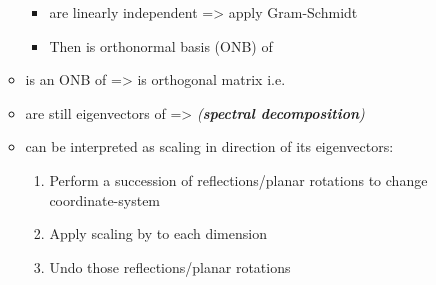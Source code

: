 \begin{itemize}
\begin{itemize}
    \begin{itemize}
    
    \item
       are linearly
      independent =\textgreater{} apply Gram-Schmidt
    \item
      Then  is
      orthonormal basis (ONB) of 
    \end{itemize}
  \item
     is
    an ONB of  =\textgreater{}
     is
    orthogonal matrix i.e.~
  \item
     are still eigenvectors
    of  =\textgreater{} 
    \emph{(\textbf{spectral decomposition})}
  \item
     can be interpreted as scaling
    in direction of its eigenvectors:

    \begin{enumerate}
    \def\labelenumi{\arabic{enumi})}
    
    \item
      Perform a succession of reflections/planar rotations to change
      coordinate-system
    \item
      Apply scaling by  to each dimension
    \item
      Undo those reflections/planar rotations
    \end{enumerate}
  \end{itemize}
\end{itemize}